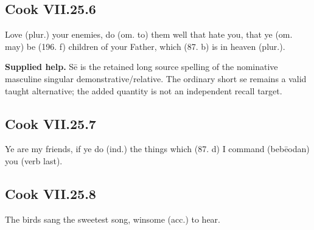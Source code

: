 \par\begin{minipage}{\linewidth}\raggedright
\subsection*{Cook VII.25.6}

Love (plur.) your enemies, do (om. to) them well that hate you, that ye (om. may) be (196. f) children of your Father, which (87. b) is in heaven (plur.).

\textbf{Supplied help.} Sē is the retained long source spelling of the nominative masculine singular demonstrative/\allowbreak{}relative. The ordinary short se remains a valid taught alternative; the added quantity is not an independent recall target.

\end{minipage}\par\addvspace{4pt}

\par\begin{minipage}{\linewidth}\raggedright
\subsection*{Cook VII.25.7}

Ye are my friends, if ye do (ind.) the things which (87. d) I command (bebēodan) you (verb last).

\end{minipage}\par\addvspace{4pt}

\par\begin{minipage}{\linewidth}\raggedright
\subsection*{Cook VII.25.8}

The birds sang the sweetest song, winsome (acc.) to hear.

\end{minipage}\par\addvspace{4pt}

